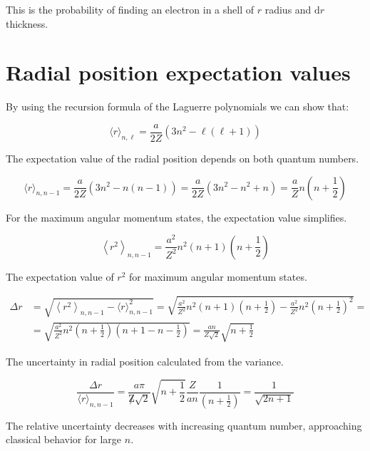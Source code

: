 This is the probability of finding an electron in a shell of $r$ radius and $\mathrm{d} r$ thickness.

\section{Radial position expectation values}
By using the recursion formula of the Laguerre polynomials we can show that:

\begin{equation}
\langle r\rangle_{n, \ell}=\frac{a}{2 Z}\left(3 n^{2}-\ell(\ell+1)\right)
\end{equation}

The expectation value of the radial position depends on both quantum numbers.

\begin{equation}
\langle r\rangle_{n, n-1}=\frac{a}{2 Z}\left(3 n^{2}-n(n-1)\right)=\frac{a}{2 Z}\left(3 n^{2}-n^{2}+n\right)=\frac{a}{Z} n\left(n+\frac{1}{2}\right)
\end{equation}

For the maximum angular momentum states, the expectation value simplifies.

\begin{equation}
\left\langle r^{2}\right\rangle_{n, n-1}=\frac{a^{2}}{Z^{2}} n^{2}(n+1)\left(n+\frac{1}{2}\right)
\end{equation}

The expectation value of $r^2$ for maximum angular momentum states.

\begin{align}
\Delta r & =\sqrt{\left\langle r^{2}\right\rangle_{n, n-1}-\langle r\rangle_{n, n-1}^{2}}=\sqrt{\frac{a^{2}}{Z^{2}} n^{2}(n+1)\left(n+\frac{1}{2}\right)-\frac{a^{2}}{Z^{2}} n^{2}\left(n+\frac{1}{2}\right)^{2}}= \\
& =\sqrt{\frac{a^{2}}{Z^{2}} n^{2}\left(n+\frac{1}{2}\right)\left(n+1-n-\frac{1}{2}\right)}=\frac{a n}{Z \sqrt{2}} \sqrt{n+\frac{1}{2}}
\end{align}

The uncertainty in radial position calculated from the variance.

\begin{equation}
\frac{\Delta r}{\langle r\rangle_{n, n-1}}=\frac{a \pi}{\not Z \sqrt{2}} \sqrt{n+\frac{1}{2}} \frac{Z}{a n} \frac{1}{\left(n+\frac{1}{2}\right)}=\frac{1}{\sqrt{2 n+1}}
\end{equation}

The relative uncertainty decreases with increasing quantum number, approaching classical behavior for large $n$.

